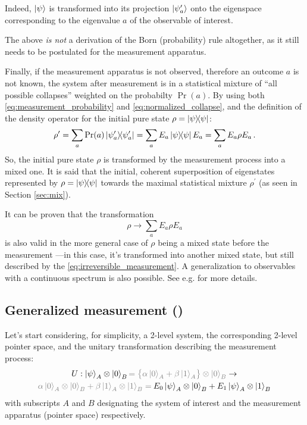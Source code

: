 Indeed,
$\ket{\psi}$
is transformed
into its projection $\ket{\psi^\prime_a}$
onto the eigenspace
corresponding to the eigenvalue $a$ of the observable of interest.

The above \emph{is not} a derivation of the Born (probability) rule altogether,
as it still needs to be postulated for the measurement apparatus.

Finally, if the measurement apparatus is not observed,
therefore an outcome $a$ is not known,
the system after measurement is in a statistical mixture
of ``all possible collapses'' weighted on the probabilty $\Pr(a)$.
By using both \eqref{eq:measurement_probability} and \eqref{eq:normalized_collapse},
and the definition of the density operator for the initial pure state
$\rho = \ketbra{\psi}$:
\[
  \rho^{\prime} = \sum_a \Pr(a) \ketbra{\psi^{\prime}_a} = \sum_a E_a \ketbra{\psi} E_a
    = \sum_a E_a \rho E_a \,\text{.}
\]
So, the initial pure state $\rho$ is transformed by the measurement process into a mixed one.
It is said that the initial, coherent superposition of eigenstates represented by $\rho = \ketbra{\psi}$
 towards the maximal statistical mixture $\rho^{\prime}$
(as seen in Section \ref{sec:mix}).

It can be proven that the transformation
\begin{equation}\label{eq:irreversible_measurement}
  \rho \rightarrow \sum_a E_a \rho E_a
\end{equation}
is also valid in the more general case of $\rho$ being a mixed state before the measurement
---in this case, it's transformed into another mixed state,
but still described by the \eqref{eq:irreversible_measurement}.
A generalization to observables with a continuous spectrum is also possible.
See e.g. \cite[Section 3.1.1]{PreskillNotes} for more details.


\subsection{Generalized measurement ()}
\label{subsec:POVM}

Let's start considering, for simplicity, a 2-level system,
the corresponding 2-level pointer space,
and the unitary transformation describing the measurement process:
\begin{multline}\label{eq:qubit_ortho_measurement}
  U:
    \ket{\psi}_A \ox \ket{0}_B
    {\color{gray}= \qty\big{\alpha\ket{0}_A + \beta\ket{1}_A} \ox \ket{0}_B}
  \rightarrow \\
    {\color{gray}\alpha\ket{0}_A \ox \ket{0}_B + \beta\ket{1}_A  \ox \ket{1}_B =}
    \:
    E_0\ket{\psi}_A \ox \ket{0}_B + E_1\ket{\psi}_A \ox \ket{1}_B
\end{multline}
with subscripts $A$ and $B$ designating the system of interest and
the measurement apparatus (pointer space) respectively.

